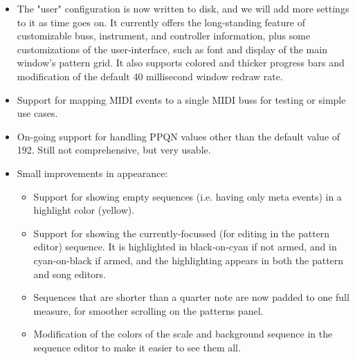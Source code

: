\documentclass[
 11pt,
 twoside,
 a4paper,
 headinclude,
 footinclude,
 final                                 %
]{article}
\begin{document}
\begin{itemize}
\begin{itemize}
            (painting) mode enabled after releasing the right mouse button, for
            some of the modern crappy touchpads shipped with "gamer" laptops.
         \item Shift-left-click on a pattern slot (in the pattern editor),
            or on the pattern name or M (mute) (in the song editor)
            to toggle the status of all of the other active slots.
            Useful for listening to a single track by itself.
         \item Right-click on a the virtual keyboard in the pattern editor
            toggles between showing letters/octaves (e.g. "C4") versus
            the MIDI note numbers.  
      \end{itemize}
      \item The "user" configuration is now written to disk, and we will
         add more settings to it as time goes on.  It currently offers the
         long-standing feature of customizable buss, instrument, and controller
         information, plus some customizations of the user-interface, such as
         font and display of the main window's pattern grid.  It also supports
         colored and thicker progress bars and modification of the default 40
         millisecond window redraw rate.
      \item Support for mapping MIDI events to a single MIDI buss for testing
         or simple use cases.
      \item On-going support for handling PPQN values other than the
         default value of 192.  Still not comprehensive, but very usable.
      \item Small improvements in appearance:
      \begin{itemize}
         \item Support for showing empty sequences (i.e. having only meta
            events) in a highlight color (yellow).
         \item Support for showing the currently-focussed (for editing in the
            pattern editor) sequence.  It is highlighted in black-on-cyan if
            not armed, and in cyan-on-black if armed, and the highlighting
            appears in both the pattern and song editors.
         \item Sequences that are shorter than a quarter note are now padded to
            one full measure, for smoother scrolling on the patterns panel.
         \item Modification of the colors of the scale and background sequence
            in the sequence editor to make it easier to see them all.

\end{itemize}
\end{itemize}
\end{document}
